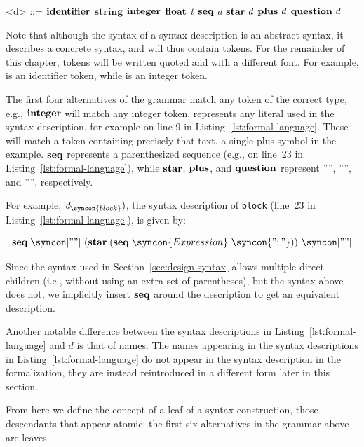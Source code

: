\documentclass{kththesis}
\newcommand{\ssynt}[1]{\ensuremath{\mathit{#1}}}
\newenvironment{sgrammar}{\begin{grammar}\renewcommand{\grammarlabel}[2]{\ssynt{##1} \hfill##2}}{\end{grammar}}
\begin{document}
\setlength{\grammarindent}{3em}
\begin{sgrammar}
<d> ::= $\mathrel{\mathbf{identifier}}$
  \alt $\mathbf{string}$
  \alt $\mathrel{\mathbf{integer}}$
  \alt $\mathrel{\mathbf{float}}$
  \alt {}
  \alt \ssynt{t}
  \alt $\mathrel{\mathbf{seq}}$ $\overline{\ssynt{d}}$
  \alt $\repstar \ssynt{d}$
  \alt $\repplus \ssynt{d}$
  \alt $\repquestion \ssynt{d}$
\end{sgrammar}

Note that although the syntax of a syntax description is an abstract syntax, it describes a concrete syntax, and will thus contain tokens. For the remainder of this chapter, tokens will be written quoted and with a different font. For example,  is an identifier token, while  is an integer token.

The first four alternatives of the grammar match any token of the correct type, e.g., $\mathrel{\mathbf{integer}}$ will match any integer token.  represents any literal used in the syntax description, for example  on line 9 in Listing~\ref{lst:formal-language}. These will match a token containing precisely that text, a single plus symbol in the example. $\mathrel{\mathbf{seq}}$ represents a parenthesized sequence (e.g., on line~23 in Listing~\ref{lst:formal-language}), while $\mathrel{\mathbf{star}}$, $\mathrel{\mathbf{plus}}$, and $\mathrel{\mathbf{question}}$ represent ''\syncon{*}'', ''\syncon{+}'', and '''', respectively.

For example, $\ssynt{d}_{\syncon{block}})$, the syntax description of \texttt{block} (line~23 in Listing~\ref{lst:formal-language}), is given by:

$$
\seq \syncon|"{"|\ (\repstar (\seq \syncon{Expression}\ \syncon{";"}))\ \syncon|"}"|
$$

Since the syntax used in Section~\ref{sec:design-syntax} allows multiple direct children (i.e., without using an extra set of parentheses), but the syntax above does not, we implicitly insert $\mathrel{\mathbf{seq}}$ around the description to get an equivalent description.

Another notable difference between the syntax descriptions in Listing~\ref{lst:formal-language} and \ssynt{d} is that of names. The names appearing in the syntax descriptions in Listing~\ref{lst:formal-language} do not appear in the syntax description in the formalization, they are instead reintroduced in a different form later in this section.

From here we define the concept of a leaf of a syntax construction, those descendants that appear atomic: the first six alternatives in the grammar above are leaves.
\end{document}
